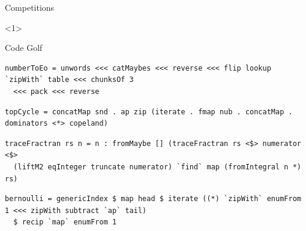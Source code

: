 \documentclass{beamer}
\begin{document}
\begin{frame}[fragile]{Competitions}
\begin{onlyenv}<1>

\centerline{Code Golf}
\vspace{15pt}
\begin{verbatim}
numberToEo = unwords <<< catMaybes <<< reverse <<< flip lookup `zipWith` table <<< chunksOf 3
  <<< pack <<< reverse
\end{verbatim}
\begin{verbatim}
topCycle = concatMap snd . ap zip (iterate . fmap nub . concatMap . dominators <*> copeland)
\end{verbatim}
\begin{verbatim}
traceFractran rs n = n : fromMaybe [] (traceFractran rs <$> numerator <$>
  (liftM2 eqInteger truncate numerator) `find` map (fromIntegral n *) rs)
\end{verbatim}
\begin{verbatim}
bernoulli = genericIndex $ map head $ iterate ((*) `zipWith` enumFrom 1 <<< zipWith subtract `ap` tail)
  $ recip `map` enumFrom 1
\end{verbatim}



\end{onlyenv}
\end{frame}
\end{document}
